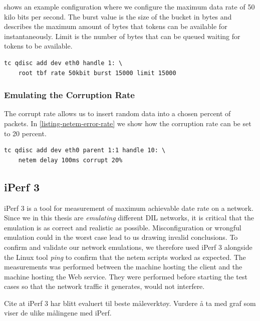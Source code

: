  shows an example configuration where we configure
the maximum data rate of 50 kilo bits per second. The burst value is the size of
the bucket in bytes and describes the maximum amount of bytes that tokens can be
available for instantaneously. Limit is the number of bytes that can be queued
waiting for tokens to be available.

\begin{lstlisting}[frame=single, caption="Emulating data rate", label=listing-netem-data-rate]
  tc qdisc add dev eth0 handle 1: \
    root tbf rate 50kbit burst 15000 limit 15000
\end{lstlisting}

\subsubsection{Emulating the Corruption Rate}

The corrupt rate allows us to insert random data into a chosen percent of
packets. In \cref{listing-netem-error-rate} we show how the corruption rate can
be set to 20 percent.

\begin{lstlisting}[frame=single, caption="Emulating corruption rate", label=listing-netem-error-rate]
  tc qdisc add dev eth0 parent 1:1 handle 10: \
    netem delay 100ms corrupt 20%
\end{lstlisting}


\subsection{iPerf 3}

iPerf 3 is a tool for measurement of maximum achievable date rate on a
network\cite{iperf3-homepage}. Since we in this thesis are \textit{emulating}
different DIL networks, it is critical that the emulation is as correct and
realistic as possible. Misconfiguration or wrongful emulation could in the worst
case lead to us drawing invalid conclusions. To confirm and validate our network
emulations, we therefore used iPerf 3 alongside the Linux tool \textit{ping} to
confirm that the \gls{netem} scripts worked as expected. The measurements was
performed between the machine hosting the client and the machine hosting the Web
service. They were performed before starting the test cases so that the network
traffic it generates, would not interfere.

Cite at iPerf 3 har blitt evaluert til beste måleverktøy. Vurdere å ta med graf som viser de ulike målingene med iPerf.

